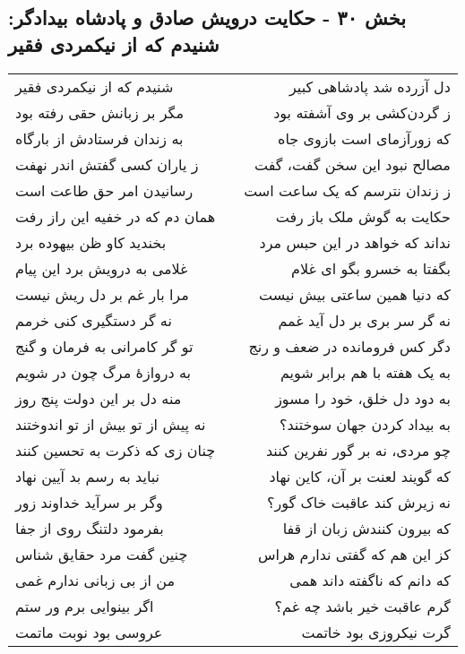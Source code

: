 \begin{center}
\section*{بخش ۳۰ - حکایت درویش صادق و پادشاه بیدادگر: شنیدم که از نیکمردی فقیر}
\label{sec:030}
\begin{longtable}{l p{0.5cm} r}
شنیدم که از نیکمردی فقیر
&&
دل آزرده شد پادشاهی کبیر
\\
مگر بر زبانش حقی رفته بود
&&
ز گردن‌کشی بر وی آشفته بود
\\
به زندان فرستادش از بارگاه
&&
که زورآزمای است بازوی جاه
\\
ز یاران کسی گفتش اندر نهفت
&&
مصالح نبود این سخن گفت، گفت
\\
رسانیدن امر حق طاعت است
&&
ز زندان نترسم که یک ساعت است
\\
همان دم که در خفیه این راز رفت
&&
حکایت به گوش ملک باز رفت
\\
بخندید کاو ظن بیهوده برد
&&
نداند که خواهد در این حبس مرد
\\
غلامی به درویش برد این پیام
&&
بگفتا به خسرو بگو ای غلام
\\
مرا بار غم بر دل ریش نیست
&&
که دنیا همین ساعتی بیش نیست
\\
نه گر دستگیری کنی خرمم
&&
نه گر سر بری بر دل آید غمم
\\
تو گر کامرانی به فرمان و گنج
&&
دگر کس فرومانده در ضعف و رنج
\\
به دروازهٔ مرگ چون در شویم
&&
به یک هفته با هم برابر شویم
\\
منه دل بر این دولت پنج روز
&&
به دود دل خلق، خود را مسوز
\\
نه پیش از تو بیش از تو اندوختند
&&
به بیداد کردن جهان سوختند؟
\\
چنان زی که ذکرت به تحسین کنند
&&
چو مردی، نه بر گور نفرین کنند
\\
نباید به رسم بد آیین نهاد
&&
که گویند لعنت بر آن، کاین نهاد
\\
وگر بر سرآید خداوند زور
&&
نه زیرش کند عاقبت خاک گور؟
\\
بفرمود دلتنگ روی از جفا
&&
که بیرون کنندش زبان از قفا
\\
چنین گفت مرد حقایق شناس
&&
کز این هم که گفتی ندارم هراس
\\
من از بی زبانی ندارم غمی
&&
که دانم که ناگفته داند همی
\\
اگر بینوایی برم ور ستم
&&
گرم عاقبت خیر باشد چه غم؟
\\
عروسی بود نوبت ماتمت
&&
گرت نیکروزی بود خاتمت
\\
\end{longtable}
\end{center}
